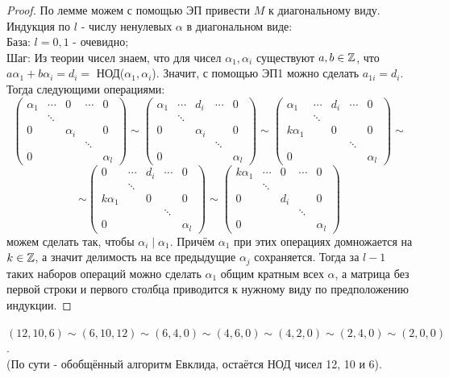 \begin{proof}
    По лемме можем с помощью ЭП привести $M$ к диагональному виду. Индукция по $l$ - числу ненулевых $\alpha$ в диагональном виде:\\
    \tab База: $l = 0, 1$ - очевидно;\\
    \tab Шаг: Из теории чисел знаем, что для чисел $\alpha_1, \alpha_i$ существуют $a, b \in \mathbb{Z}$, что $a\alpha_1 + b\alpha_i = d_i =$ НОД($\alpha_1, \alpha_i$). Значит, с помощью ЭП1 можно сделать $a_{1i} = d_i$. Тогда следующими операциями:
    \[\begin{pmatrix}
    \alpha_1&\cdots&0&\cdots&0\\ &\ddots&&&\\ 0&&\alpha_i&&0\\ &&&\ddots&\\0&&&&\alpha_l
    \end{pmatrix} \sim \begin{pmatrix}
    \alpha_1&\cdots&d_i&\cdots&0\\ &\ddots&&&\\ 0&&\alpha_i&&0\\ &&&\ddots&\\0&&&&\alpha_l
    \end{pmatrix} \sim \begin{pmatrix}
    \alpha_1&\cdots&d_i&\cdots&0\\ &\ddots&&&\\ k\alpha_1&&0&&0\\ &&&\ddots&\\0&&&&\alpha_l
    \end{pmatrix} \sim\]
    \[\sim \begin{pmatrix}
    0&\cdots&d_i&\cdots&0\\ &\ddots&&&\\ k\alpha_1&&0&&0\\ &&&\ddots&\\0&&&&\alpha_l
    \end{pmatrix} \sim \begin{pmatrix}
    k\alpha_1&\cdots&0&\cdots&0\\ &\ddots&&&\\ 0&&d_i&&0\\ &&&\ddots&\\0&&&&\alpha_l
    \end{pmatrix}\]
    можем сделать так, чтобы $\alpha_i \mid \alpha_1$. Причём $\alpha_1$ при этих операциях домножается на $k \in \mathbb{Z}$, а значит делимость на все предыдущие $\alpha_j$ сохраняется. Тогда за $l-1$ таких наборов операций можно сделать $\alpha_1$ общим кратным всех $\alpha$, а матрица без первой строки и первого столбца приводится к нужному виду по предположению индукции.
\end{proof}
\begin{example}
    $(12, 10, 6) \sim (6, 10, 12) \sim (6, 4, 0) \sim (4, 6, 0) \sim (4, 2, 0) \sim (2, 4, 0) \sim (2, 0, 0)$.\\
    (По сути - обобщённый алгоритм Евклида, остаётся НОД чисел 12, 10 и 6).
\end{example}
\setcounter{thcount}{0}
